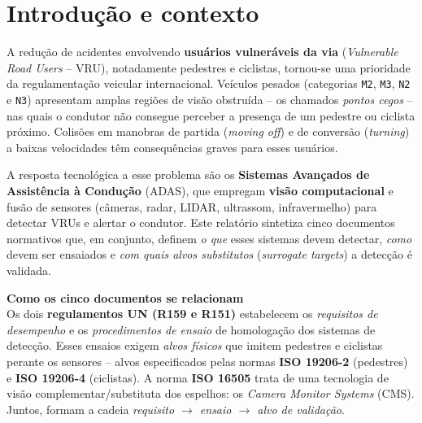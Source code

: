 \documentclass[11pt,a4paper]{article}
\newcommand{\destaque}[2]{%
  \begin{center}
  \begin{minipage}{0.96\linewidth}
  \colorbox{azulclaro}{\parbox{\dimexpr\linewidth-2\fboxsep}{%
  \textbf{\textcolor{azulun}{#1}}\\[2pt]\small #2}}
  \end{minipage}
  \end{center}}
\begin{document}
\tableofcontents
\thispagestyle{empty}
\clearpage

\section{Introdução e contexto}

A redução de acidentes envolvendo \textbf{usuários vulneráveis da via}
(\emph{Vulnerable Road Users} -- VRU), notadamente pedestres e ciclistas,
tornou-se uma prioridade da regulamentação veicular internacional. Veículos
pesados (categorias \texttt{M2}, \texttt{M3}, \texttt{N2} e \texttt{N3})
apresentam amplas regiões de visão obstruída -- os chamados \emph{pontos
cegos} -- nas quais o condutor não consegue perceber a presença de um
pedestre ou ciclista próximo. Colisões em manobras de partida (\emph{moving
off}) e de conversão (\emph{turning}) a baixas velocidades têm consequências
graves para esses usuários.

A resposta tecnológica a esse problema são os \textbf{Sistemas Avançados de
Assistência à Condução} (ADAS), que empregam \textbf{visão computacional} e
fusão de sensores (câmeras, radar, LIDAR, ultrassom, infravermelho) para
detectar VRUs e alertar o condutor. Este relatório sintetiza cinco documentos
normativos que, em conjunto, definem \emph{o que} esses sistemas devem
detectar, \emph{como} devem ser ensaiados e \emph{com quais alvos
substitutos} (\emph{surrogate targets}) a detecção é validada.

\destaque{Como os cinco documentos se relacionam}{Os dois \textbf{regulamentos
UN (R159 e R151)} estabelecem os \emph{requisitos de desempenho} e os
\emph{procedimentos de ensaio} de homologação dos sistemas de detecção. Esses
ensaios exigem \emph{alvos físicos} que imitem pedestres e ciclistas perante
os sensores -- alvos especificados pelas normas \textbf{ISO 19206-2}
(pedestres) e \textbf{ISO 19206-4} (ciclistas). A norma \textbf{ISO 16505}
trata de uma tecnologia de visão complementar/substituta dos espelhos: os
\emph{Camera Monitor Systems} (CMS). Juntos, formam a cadeia
\emph{requisito $\rightarrow$ ensaio $\rightarrow$ alvo de validação}.}
\end{document}
